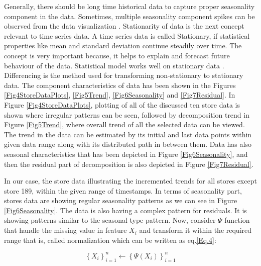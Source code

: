 Generally, there should be long time historical data to capture proper seasonality component in the data. Sometimes, multiple seasonality component spikes can be observed from the data visualization \cite{pavlyshenko2019machine}. Stationarity of data is the next concept relevant to time series data. A time series data is called Stationary, if statistical properties like mean and standard deviation continue steadily over time. The concept is very important because, it helps to explain and forecast future behaviour of the data. Statistical model works well on stationary data \cite{vlahogianni2006statistical}. Differencing \cite{hossain2019over} is the method used for transforming non-stationary to stationary data. The component characteristics of data has been shown in the Figures \ref{Fig4StoreDataPlots}, \ref{Fig5Trend}, \ref{Fig6Seasonality} and \ref{Fig7Residual}. In Figure \ref{Fig4StoreDataPlots}, plotting of all of the discussed ten store data is shown where irregular patterns can be seen, followed by decomposition trend in Figure \ref{Fig5Trend}, where overall trend of all the selected data can be viewed. The trend in the data can be estimated by its initial and last data points within given data range along with its distributed path in between them. Data has also seasonal characteristics that has been depicted in Figure  \ref{Fig6Seasonality}, and then the residual part of decomposition is also depicted in Figure \ref{Fig7Residual}.

In our case, the store data illustrating the incremented trends for all stores except store 189, within the given range of timestamps. In terms of seasonality part, stores data are showing regular seasonality patterns as we can see in Figure  \ref{Fig6Seasonality}. The data is also having a complex pattern for residuals. It is showing patterns similar to the seasonal type pattern. Now, consider $\Psi$ function that handle the missing value in feature $X_{i}$ and transform it within the required range that is, called normalization which can be written as eq.\ref{Eq.4}:

\begin{equation}
\label{Eq.4}
    \left \{ X_{i} \right \}_{i=1}^{n} \leftarrow \left \{ \Psi (X_{i}) \right \}_{i=1}^{n}
\end{equation}




